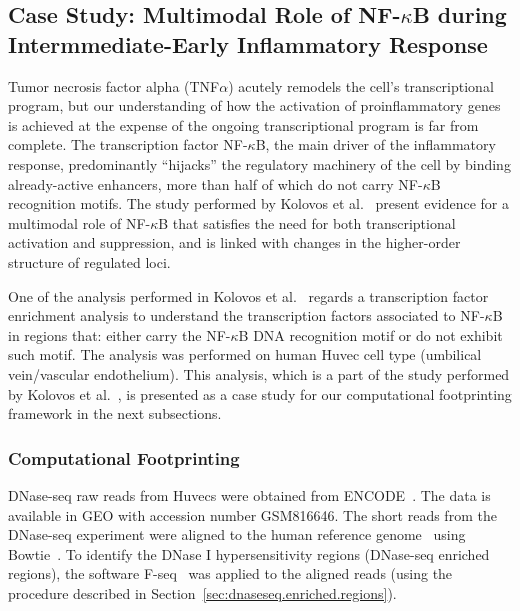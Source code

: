 \subsection{Case Study: Multimodal Role of NF-$\kappa$B during Intermmediate-Early Inflammatory Response}
\label{sec:case.study.nfkb}

Tumor necrosis factor alpha (TNF$\alpha$) acutely remodels the cell’s transcriptional program, but our understanding of how the activation of proinflammatory genes is achieved at the expense of the ongoing transcriptional program is far from complete. The transcription factor NF-$\kappa$B, the main driver of the inflammatory response, predominantly ``hijacks'' the regulatory machinery of the cell by binding already-active enhancers, more than half of which do not carry NF-$\kappa$B recognition motifs. The study performed by Kolovos et al.~\cite{kolovos2016} present evidence for a multimodal role of NF-$\kappa$B that satisfies the need for both transcriptional activation and suppression, and is linked with changes in the higher-order structure of regulated loci.

One of the analysis performed in Kolovos et al.~\cite{kolovos2016} regards a transcription factor enrichment analysis to understand the transcription factors associated to NF-$\kappa$B in regions that: either carry the NF-$\kappa$B DNA recognition motif or do not exhibit such motif. The analysis was performed on human Huvec cell type (umbilical vein/vascular endothelium). This analysis, which is a part of the study performed by Kolovos et al.~\cite{kolovos2016}, is presented as a case study for our computational footprinting framework in the next subsections.

\subsubsection{Computational Footprinting}
\label{sec:cs2.computational.footprinting}

DNase-seq raw reads from Huvecs were obtained from ENCODE~\cite{encode2012}. The data is available in GEO with accession number GSM816646. The short reads from the DNase-seq experiment were aligned to the human reference genome~\cite{encode2012} using Bowtie~\cite{langmead2012}. To identify the DNase I hypersensitivity regions (DNase-seq enriched regions), the software F-seq~\cite{boyle2008b} was applied to the aligned reads (using the procedure described in Section~\ref{sec:dnaseseq.enriched.regions}).

